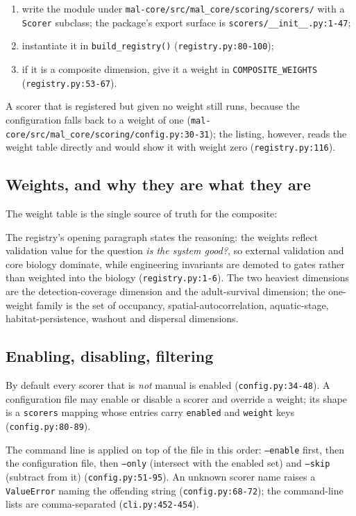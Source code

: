 \documentclass[11pt,a4paper]{article}
\newcommand{\code}[1]{\texttt{#1}}
\begin{document}
\begin{enumerate}
\item write the module under \code{mal-core/src/mal\_core/scoring/scorers/}
      with a \code{Scorer} subclass; the package's export surface is
      \code{scorers/\_\_init\_\_.py:1-47};
\item instantiate it in \code{build\_registry()} (\code{registry.py:80-100});
\item if it is a composite dimension, give it a weight in
      \code{COMPOSITE\_WEIGHTS} (\code{registry.py:53-67}).
\end{enumerate}

A scorer that is registered but given no weight still runs, because the
configuration falls back to a weight of one
(\code{mal-core/src/mal\_core/scoring/config.py:30-31}); the listing, however,
reads the weight table directly and would show it with weight zero
(\code{registry.py:116}).

\subsection{Weights, and why they are what they are}

The weight table is the single source of truth for the composite:



The registry's opening paragraph states the reasoning: the weights reflect
validation value for the question \emph{is the system good?}, so external
validation and core biology dominate, while engineering invariants are
demoted to gates rather than weighted into the biology
(\code{registry.py:1-6}). The two heaviest dimensions are the
detection-coverage dimension and the adult-survival dimension; the
one-weight family is the set of occupancy, spatial-autocorrelation,
aquatic-stage, habitat-persistence, washout and dispersal dimensions.

\subsection{Enabling, disabling, filtering}

By default every scorer that is \emph{not} manual is enabled
(\code{config.py:34-48}). A configuration file may enable or disable a
scorer and override a weight; its shape is a \code{scorers} mapping whose
entries carry \code{enabled} and \code{weight} keys
(\code{config.py:80-89}).

The command line is applied on top of the file in this order: \code{--enable}
first, then the configuration file, then \code{--only} (intersect with the
enabled set) and \code{--skip} (subtract from it)
(\code{config.py:51-95}). An unknown scorer name raises a
\code{ValueError} naming the offending string (\code{config.py:68-72}); the
command-line lists are comma-separated (\code{cli.py:452-454}).
\end{document}

